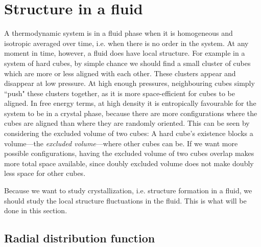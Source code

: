 \documentclass[thesis]{subfiles}
\begin{document}
\newpage

\section{Structure in a fluid}

A thermodynamic system is in a fluid phase when it is homogeneous and isotropic averaged over time, i.e. when there is no order in the system. At any moment in time, however, a fluid does have local structure. For example in a system of hard cubes, by simple chance we should find a small cluster of cubes which are more or less aligned with each other. These clusters appear and disappear at low pressure. At high enough pressures, neighbouring cubes simply ``push" these clusters together, as it is more space-efficient for cubes to be aligned. In free energy terms, at high density it is entropically favourable for the system to be in a crystal phase, because there are more configurations where the cubes are aligned than where they are randomly oriented. This can be seen by considering the excluded volume of two cubes: A hard cube's existence blocks a volume---the \emph{excluded volume}---where other cubes can be. If we want more possible configurations, having the excluded volume of two cubes overlap makes more total space available, since doubly excluded volume does not make doubly less space for other cubes.

Because we want to study crystallization, i.e. structure formation in a fluid, we should study the local structure fluctuations in the fluid. This is what will be done in this section.

\subsection{Radial distribution function}
\end{document}
